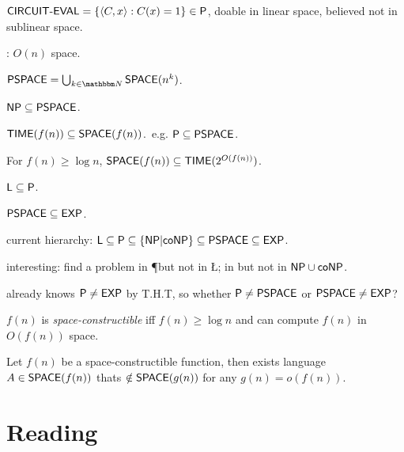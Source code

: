 \documentclass{article}
\begin{document}
\( \text{\sf CIRCUIT-EVAL} = \lbrace \langle C, x\rangle : C(x) = 1 \rbrace \in \text{\sf P}\), doable in linear space, believed not in sublinear space.

: \(O(n)\) space.

\begin{definition}
  \( \PSPACE = \bigcup_{k \in \N} \SPACE(n^k) \).
\end{definition}

\begin{exercise}
  \( \text{\sf NP} \subseteq \text{\sf PSPACE} \).
\end{exercise}

\begin{fact}
  \( \text{\sf TIME}(f(n)) \subseteq \text{\sf SPACE}(f(n)) \).\ e.g. \( \text{\sf P} \subseteq \text{\sf PSPACE} \).
\end{fact}

\begin{theorem}
  For \(f(n) \geq \log n\), \( \text{\sf SPACE}(f(n)) \subseteq \text{\sf TIME}(2^{O(f(n))}) \).
\end{theorem}

\begin{corollary}
  \( \text{\sf L} \subseteq \text{\sf P} \).
\end{corollary}

\begin{corollary}
  \( \text{\sf PSPACE} \subseteq \text{\sf EXP} \).
\end{corollary}

current hierarchy: \( \text{\sf L} \subseteq \text{\sf P} \subseteq \lbrace\text{\sf NP} | \text{\sf coNP}\rbrace \subseteq \text{\sf PSPACE} \subseteq \text{\sf EXP} \).

interesting: find a problem in \P but not in \L; in \PSPACE but not in \(\text{\sf NP} \cup \text{\sf coNP}\).

already knows \( \text{\sf P} \neq \text{\sf EXP} \) by T.H.T, so whether \( \text{\sf P} \neq \text{\sf PSPACE} \) or \( \text{\sf PSPACE} \neq \text{\sf EXP} \)?

\begin{definition}
  \(f(n)\) is {\it space-constructible} iff \(f(n) \geq \log n\) and can compute \(f(n)\) in \(O(f(n))\) space.
\end{definition}

\begin{theorem}
  Let \(f(n)\) be a space-constructible function, then exists language \(A \in \text{\sf SPACE}(f(n))\) thats \(\notin \text{\sf SPACE}(g(n))\) for any \(g(n) = o(f(n))\).
\end{theorem}

\section{Reading}
\end{document}
